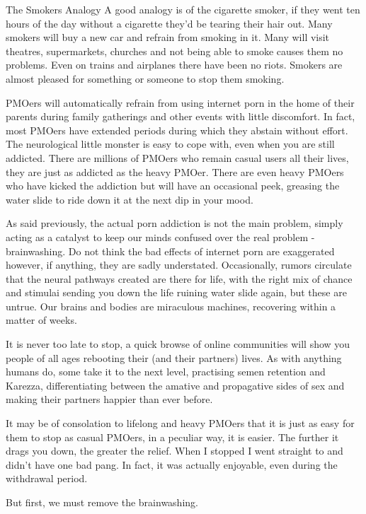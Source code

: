 The Smokers Analogy
A good analogy is of the cigarette smoker, if they went ten hours of the day without a cigarette they'd be tearing their hair out. Many smokers will buy a new car and refrain from smoking in it. Many will visit theatres, supermarkets, churches and not being able to smoke causes them no problems. Even on trains and airplanes there have been no riots. Smokers are almost pleased for something or someone to stop them smoking.

PMOers will automatically refrain from using internet porn in the home of their parents during family gatherings and other events with little discomfort. In fact, most PMOers have extended periods during which they abstain without effort. The neurological little monster is easy to cope with, even when you are still addicted. There are millions of PMOers who remain casual users all their lives, they are just as addicted as the heavy PMOer. There are even heavy PMOers who have kicked the addiction but will have an occasional peek, greasing the water slide to ride down it at the next dip in your mood.

As said previously, the actual porn addiction is not the main problem, simply acting as a catalyst to keep our minds confused over the real problem - brainwashing. Do not think the bad effects of internet porn are exaggerated however, if anything, they are sadly understated. Occasionally, rumors circulate that the neural pathways created are there for life, with the right mix of chance and stimulai sending you down the life ruining water slide again, but these are untrue. Our brains and bodies are miraculous machines, recovering within a matter of weeks.

It is never too late to stop, a quick browse of online communities will show you people of all ages rebooting their (and their partners) lives. As with anything humans do, some take it to the next level, practising semen retention and Karezza, differentiating between the amative and propagative sides of sex and making their partners happier than ever before.

It may be of consolation to lifelong and heavy PMOers that it is just as easy for them to stop as casual PMOers, in a peculiar way, it is easier. The further it drags you down, the greater the relief. When I stopped I went straight to  and didn't have one bad pang. In fact, it was actually enjoyable, even during the withdrawal period.

But first, we must remove the brainwashing.

